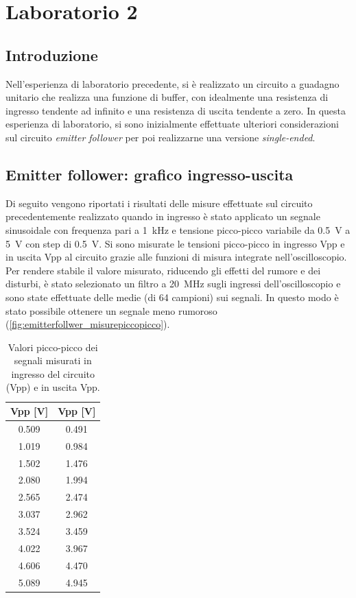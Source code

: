\chapter{Laboratorio 2}
\section{Introduzione}
Nell'esperienza di laboratorio precedente, si è realizzato un circuito a guadagno unitario che realizza una funzione di buffer, con idealmente una resistenza di ingresso tendente ad infinito e una resistenza di uscita tendente a zero. In questa esperienza di laboratorio, si sono inizialmente effettuate ulteriori considerazioni sul circuito \textit{emitter follower} per poi realizzarne una versione \textit{single-ended}.

\section{Emitter follower: grafico ingresso-uscita}
Di seguito vengono riportati i risultati delle misure effettuate sul circuito precedentemente realizzato quando in ingresso è stato applicato un segnale sinusoidale con frequenza pari a \SI{1}{\kilo\hertz} e tensione picco-picco variabile da \SI{0.5}{\volt} a \SI{5}{\volt} con step di \SI{0.5}{\volt}. Si sono misurate le tensioni picco-picco in ingresso Vpp e in uscita Vpp al circuito grazie alle funzioni di misura integrate nell'oscilloscopio. Per rendere stabile il valore misurato, riducendo gli effetti del rumore e dei disturbi, è stato selezionato un filtro a \SI{20}{\mega\hertz} sugli ingressi dell'oscilloscopio e sono state effettuate delle medie (di 64 campioni) sui segnali. In questo modo è stato possibile ottenere un segnale meno rumoroso (\Fig\ref{fig:emitterfollwer_misurepiccopicco}).
\begin{table}[h!]
	\centering
	\begin{tabular}{c|c}
		\hline
		Vpp\sub{i} [V] & Vpp\sub{o} [V]\\ \hline
		0.509 & 0.491 \\ \hline
		1.019 & 0.984 \\ \hline
		1.502 & 1.476 \\ \hline
		2.080 & 1.994 \\ \hline
		2.565 & 2.474 \\ \hline
		3.037 & 2.962 \\ \hline
		3.524 & 3.459 \\ \hline
		4.022 & 3.967 \\ \hline
		4.606 & 4.470 \\ \hline
		5.089 & 4.945 \\ \hline
	\end{tabular}
	\caption{Valori picco-picco dei segnali misurati in ingresso del circuito (Vpp) e in uscita Vpp.}
	\label{tab:misurepiccopicco}
\end{table}
